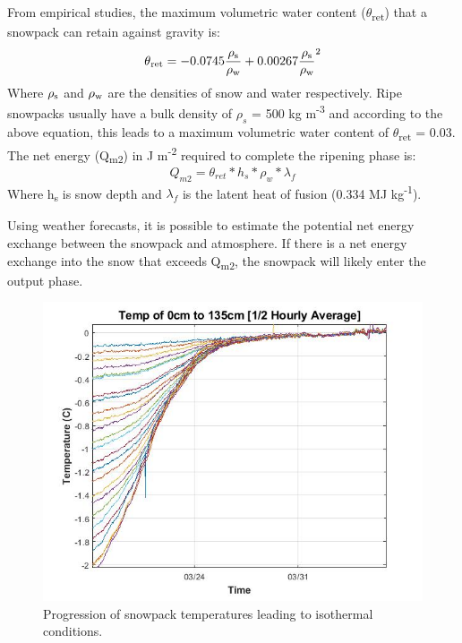 From empirical studies, the maximum volumetric water content ($\theta$\textsubscript{ret}) that a snowpack can retain against gravity is: 
\begin{equation}
\theta \textsubscript{ret} = -0.0745\frac{\rho \textsubscript{s}}{\rho \textsubscript{w}}
+ 0.00267\frac{\rho \textsubscript{s}}{\rho \textsubscript{w}}^2 
\end{equation}
Where $\rho \textsubscript{s}$ and $\rho \textsubscript{w}$ are the densities of snow and water respectively. Ripe snowpacks usually have a bulk density of $\rho_s$ = 500 kg m\textsuperscript{-3} and according to the above equation, this leads to a maximum volumetric water content of $\theta$\textsubscript{ret} = 0.03. The net energy (Q\textsubscript{m2}) in J m\textsuperscript{-2} required to complete the ripening phase is: 
\begin{equation}
Q_{m2} = \theta_{ret} * h_s * \rho_w * \lambda_f
\end{equation}
Where h\textsubscript{s} is snow depth and $\lambda_f$ is the latent heat of fusion (0.334 MJ kg\textsuperscript{-1}). 

Using weather forecasts, it is possible to estimate the potential net energy exchange between the snowpack and atmosphere. If there is a net energy exchange into the snow that exceeds Q\textsubscript{m2}, the snowpack will likely enter the output phase. 

\begin{figure}
    \centering
    \includegraphics[width=0.7\linewidth]{figures/0_135cm_Isothermal.jpg}
    \caption{Progression of snowpack temperatures leading to isothermal conditions.}
    \label{fig:0_135cm_Isothermal}
 \end{figure}
 

